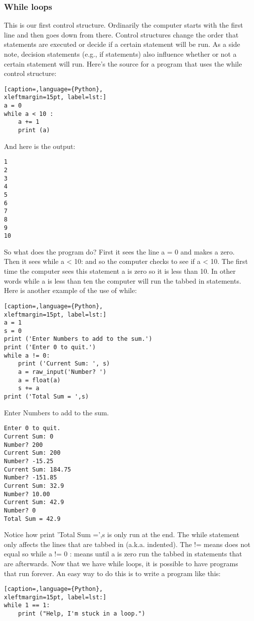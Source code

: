 \subsubsection{While loops}
This is our first control structure. Ordinarily the computer starts with the
first line and then goes down from there. Control structures change the order
that statements are executed or decide if a certain statement will be run. As a
side note, decision statements (e.g., if statements) also influence whether or
not a certain statement will run. Here's the source for a program that uses the
while control structure:
\lstset{basicstyle=\scriptsize, numbers=left, captionpos=b, tabsize=4}
\begin{lstlisting}[caption=,language={Python},
xleftmargin=15pt, label=lst:]
a = 0
while a < 10 :
    a += 1
    print (a)
\end{lstlisting}

And here is the output:
\scriptsize
\begin{verbatim}
1
2
3
4
5
6
7
8
9
10
\end{verbatim}
\normalsize

So what does the program do? First it sees the line a = 0 and makes a zero. Then
it sees while a < 10: and so the computer checks to see if a < 10. The first
time the computer sees this statement a is zero so it is less than 10. In other
words while a is less than ten the computer will run the tabbed in statements.
Here is another example of the use of while:
\lstset{basicstyle=\scriptsize, numbers=left, captionpos=b, tabsize=4}
\begin{lstlisting}[caption=,language={Python},
xleftmargin=15pt, label=lst:]
a = 1
s = 0
print ('Enter Numbers to add to the sum.')
print ('Enter 0 to quit.')
while a != 0:
    print ('Current Sum: ', s)
    a = raw_input('Number? ')
    a = float(a)
    s += a
print ('Total Sum = ',s)
\end{lstlisting}

Enter Numbers to add to the sum.
\scriptsize
\begin{verbatim}
Enter 0 to quit.
Current Sum: 0
Number? 200
Current Sum: 200
Number? -15.25
Current Sum: 184.75
Number? -151.85
Current Sum: 32.9
Number? 10.00
Current Sum: 42.9
Number? 0
Total Sum = 42.9
\end{verbatim}
\normalsize

Notice how print 'Total Sum =',s is only run at the end. The while statement
only affects the lines that are tabbed in (a.k.a. indented). The  != means does
not equal so while a != 0 : means until a is zero run the tabbed in statements
that are afterwards.  Now that we have while loops, it is possible to have
programs that run forever. An easy way to do this is to write a program like
this:
\lstset{basicstyle=\scriptsize, numbers=left, captionpos=b, tabsize=4}
\begin{lstlisting}[caption=,language={Python},
xleftmargin=15pt, label=lst:]
while 1 == 1:
    print ("Help, I'm stuck in a loop.")
\end{lstlisting}

